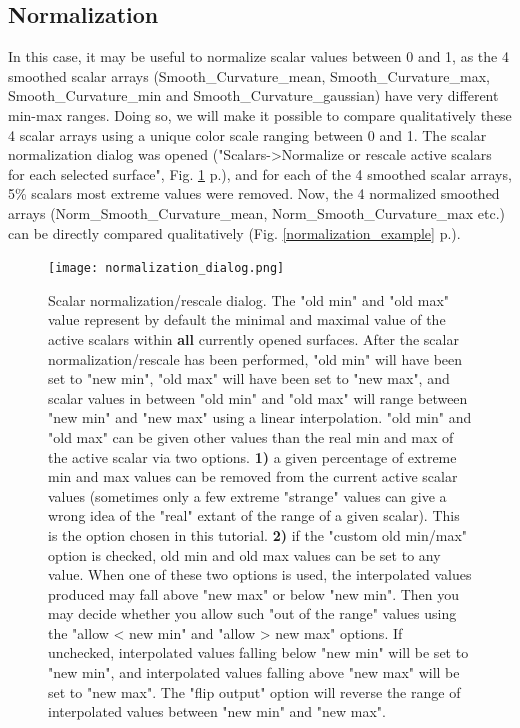 \documentclass[12pt, a4paper]{book}
\begin{document}
\subsection{Normalization}
In this case, it may be useful to normalize scalar values between 0 and 1, as the 4 smoothed scalar arrays (Smooth\_Curvature\_mean, Smooth\_Curvature\_max, Smooth\_Curvature\_min and Smooth\_Curvature\_gaussian) have very different min-max ranges. Doing so, we will make it possible to compare qualitatively these 4 scalar arrays using a unique color scale ranging between 0 and 1. The scalar normalization dialog was opened ("Scalars->Normalize or rescale active scalars for each selected surface", Fig. \ref{normalization_dialog} p.\pageref{normalization_dialog}), and for each of the 4 smoothed scalar arrays, 5\% scalars most extreme values were removed. Now, the 4 normalized smoothed arrays (Norm\_Smooth\_Curvature\_mean, Norm\_Smooth\_Curvature\_max etc.) can be directly compared qualitatively (Fig. \ref{normalization_example} p.\pageref{normalization_example}).

\begin{figure}
  \centering
  \texttt{[image: normalization\_dialog.png]} 
	\caption{ 
Scalar normalization/rescale dialog. The "old min" and "old max" value represent by default the minimal and maximal value of the active scalars within \textbf{all} currently opened surfaces. After the scalar normalization/rescale has been performed, "old min" will have been set to "new min", "old max" will have been set to "new max", and scalar values in between "old min" and "old max" will range between "new min" and "new max" using a linear interpolation. "old min" and "old max" can be given other values than the real min and max of the active scalar via two options. \textbf{1)} a given percentage of extreme min and max values can be removed from the current active scalar values (sometimes only a few extreme "strange" values can give a wrong idea of the "real" extant of the range of a given scalar). This is the option chosen in this tutorial. \textbf{2)} if the "custom old min/max" option is checked, old min and old max values can be set to any value.  When one of these two options is used, the interpolated values produced may fall above "new max" or below "new min". Then you may decide whether you allow such "out of the range" values using the "allow < new min" and "allow > new max" options. If unchecked, interpolated values falling below "new min" will be set to "new min", and interpolated values falling above "new max" will be set to "new max". The "flip output" option will reverse the range of interpolated values between "new min" and "new max".
	}
\label{normalization_dialog}
\end{figure}
\end{document}
